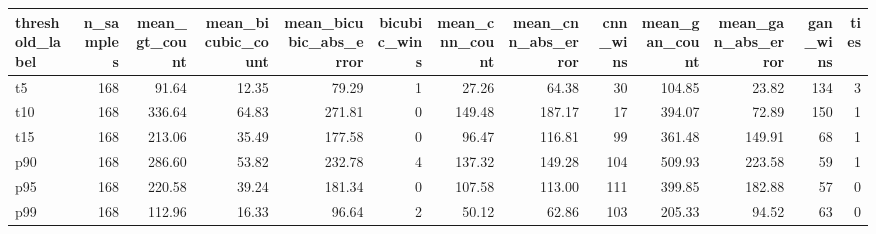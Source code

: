 \begin{tabular}{lrrrrrrrrrrrr}
\toprule
threshold_label & n_samples & mean_gt_count & mean_bicubic_count & mean_bicubic_abs_error & bicubic_wins & mean_cnn_count & mean_cnn_abs_error & cnn_wins & mean_gan_count & mean_gan_abs_error & gan_wins & ties \\
\midrule
t5 & 168 & 91.64 & 12.35 & 79.29 & 1 & 27.26 & 64.38 & 30 & 104.85 & 23.82 & 134 & 3 \\
t10 & 168 & 336.64 & 64.83 & 271.81 & 0 & 149.48 & 187.17 & 17 & 394.07 & 72.89 & 150 & 1 \\
t15 & 168 & 213.06 & 35.49 & 177.58 & 0 & 96.47 & 116.81 & 99 & 361.48 & 149.91 & 68 & 1 \\
p90 & 168 & 286.60 & 53.82 & 232.78 & 4 & 137.32 & 149.28 & 104 & 509.93 & 223.58 & 59 & 1 \\
p95 & 168 & 220.58 & 39.24 & 181.34 & 0 & 107.58 & 113.00 & 111 & 399.85 & 182.88 & 57 & 0 \\
p99 & 168 & 112.96 & 16.33 & 96.64 & 2 & 50.12 & 62.86 & 103 & 205.33 & 94.52 & 63 & 0 \\
\bottomrule
\end{tabular}
